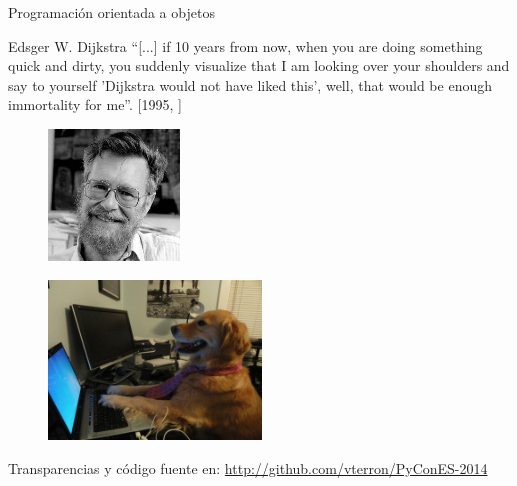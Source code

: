 
\begin{frame}{Programación orientada a objetos}
  \small
  \begin{block}
    {\centering Edsger W. Dijkstra}
    \centering
    ``[...] if 10 years from now, when you are doing something quick
    and dirty, you suddenly visualize that I am looking over your
    shoulders and say to yourself 'Dijkstra would not have liked
    this', well, that would be enough immortality for me''.
    [1995, \href{http://www.cs.utexas.edu/users/EWD/ewd12xx/EWD1213.PDF}{}]
  \end{block}

  \begin{figure}
    \centering
    \includegraphics[height=3.5cm]{pics/dijkstra-2.jpg}
  \end{figure}
\end{frame}

\begin{frame}{\inserttitle}
    \begin{figure}
    \centering
    \includegraphics[height=4.25cm]{pics/dog-no-idea-2.jpg}
  \end{figure}

  \begin{block}{\centering Transparencias y código fuente en:}
    \centering \url{http://github.com/vterron/PyConES-2014}
  \end{block}
\end{frame}
